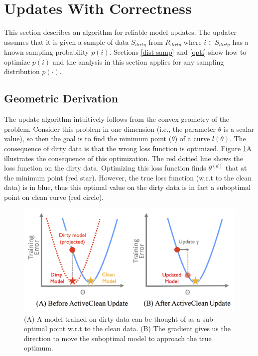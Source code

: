 \section{Updates With Correctness}\label{model-update}
This section describes an algorithm for reliable model updates.
The updater assumes that it is given a sample of data $S_{dirty}$ from $R_{dirty}$ where $i \in S_{dirty}$ has a known sampling probability $p(i)$.
Sections \ref{dist-samp} and \ref{opti} show how to optimize $p(i)$ and the analysis in this section applies for any sampling distribution $p(\cdot)$.

\subsection{Geometric Derivation}
The update algorithm intuitively follows from the convex geometry of the problem.
Consider this problem in one dimension (i.e., the parameter $\theta$ is a scalar value), so then the goal is to find the minimum point ($\theta$) of a curve $l(\theta)$.
The consequence of dirty data is that the wrong loss function is optimized.
Figure \ref{update-arch2}A illustrates the consequence of this optimization.
The red dotted line shows the loss function on the dirty data.
Optimizing this loss function finds $\theta^{(d)}$ that at the minimum point (red star).
However, the true loss function (w.r.t to the clean data) is in blue, thus
this optimal value on the dirty data is in fact a suboptimal point on clean curve (red circle).

\begin{figure}[ht!]
\centering
 \includegraphics[width=\columnwidth]{figs/update-arch2.png}\vspace{-1em}
 \caption{(A) A model trained on dirty data can be thought of as a sub-optimal point w.r.t to the clean data. (B) The gradient gives us the direction to move the suboptimal model to approach the true optimum. \label{update-arch2}}\vspace{-1em}
\end{figure}

